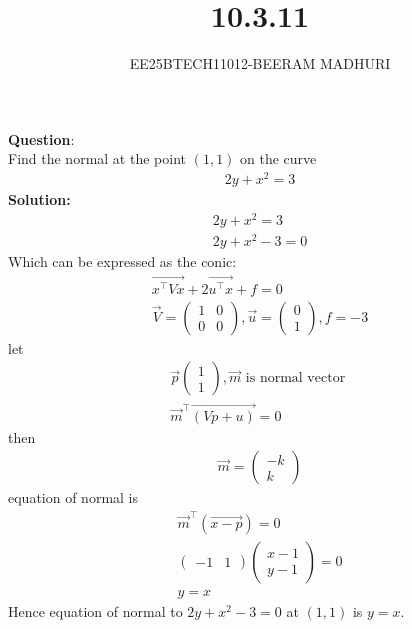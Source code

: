 \documentclass[journal]{IEEEtran}
\begin{document}

\vspace{3cm}

\title{10.3.11}
\author{EE25BTECH11012-BEERAM MADHURI}
{\let\newpage\relax\maketitle}

\renewcommand{\thefigure}{\theenumi}
\renewcommand{\thetable}{\theenumi}
\setlength{\intextsep}{10pt} %


\renewcommand{\thetable}{\theenumi}

\textbf{Question}:\\
Find the normal at the point $(1,1)$ on the curve
\begin{align}
2y + x^2 = 3
\end{align}
\textbf{Solution:}
\begin{align}
    2y + x^2 = 3\\
    2y + x^2 -3 = 0
\end{align}
Which can be expressed as the conic:
\begin{align}
\vec{x^\top V x} + 2\vec{u^\top x} + f = 0\\
\vec{V} = \begin{pmatrix}1 & 0 \\0 & 0\end{pmatrix}, \vec{u} = \begin{pmatrix}0 \\1\end{pmatrix}, f = -3
\end{align}
let 
\begin{align}
\vec{p} \begin{pmatrix} 1 \\ 1 \end{pmatrix} , \vec{m} \text{ is normal vector }\\
\vec{m}^\top \vec{(Vp + u)} = 0
\end{align}
then
\begin{align}
\vec{m} = \begin{pmatrix} -k \\ k \end{pmatrix}
\end{align}
equation of normal is
\begin{align}
    \vec{m}^\top(\vec{x-p})=0\\
    \begin{pmatrix} -1&1\end{pmatrix}\begin{pmatrix}x-1\\y-1   \end{pmatrix}=0\\
        y=x
\end{align}
Hence equation of normal to $2y + x^2 - 3 = 0$ at $(1,1)$ is $y = x$.
\end{document}
